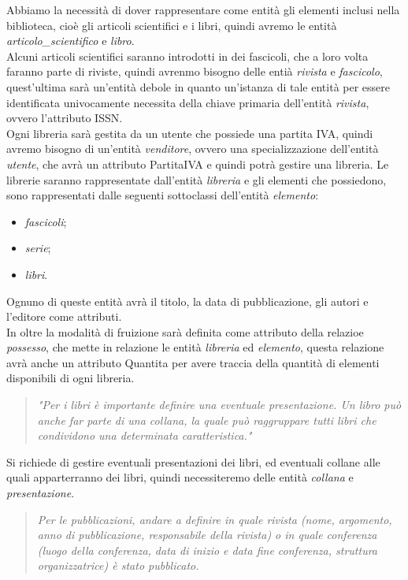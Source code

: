 \documentclass{article}
\begin{document}
Abbiamo la necessità di dover rappresentare come entità gli elementi inclusi nella biblioteca, cioè gli articoli scientifici e i libri, quindi avremo le entità \textit{articolo\_scientifico} e \textit{libro}.\\
Alcuni articoli scientifici saranno introdotti in dei fascicoli, che a loro volta faranno parte di riviste, quindi avrenmo bisogno delle entià \textit{rivista} e \textit{fascicolo}, quest'ultima sarà un'entità debole in quanto un'istanza di tale entità per essere identificata univocamente necessita della chiave primaria dell'entità \textit{rivista}, ovvero l'attributo ISSN.\\
Ogni libreria sarà gestita da un utente che possiede una partita IVA, quindi avremo bisogno di un'entità \textit{venditore}, ovvero una specializzazione dell'entità \textit{utente}, che avrà un attributo PartitaIVA e quindi potrà gestire una libreria. Le librerie saranno rappresentate dall'entità \textit{libreria} e gli elementi che possiedono, sono rappresentati dalle seguenti sottoclassi dell'entità \textit{elemento}: \begin{itemize} 
\item \textit{fascicoli}; 
\item \textit{serie};
\item \textit{libri}.
\end{itemize}
Ognuno di queste entità avrà il titolo, la data di pubblicazione, gli autori e l'editore come attributi.\\
In oltre la modalità di fruizione sarà definita come attributo della relazioe \textit{possesso}, che mette in relazione le entità \textit{libreria} ed \textit{elemento}, questa relazione avrà anche un attributo Quantita per avere traccia della quantità di elementi disponibili di ogni libreria.

\begin{quote}
\textit{"Per i libri è importante definire una eventuale presentazione. Un libro può anche far parte di una collana, la quale può raggruppare tutti libri che condividono una determinata caratteristica."}
\end{quote}

Si richiede di gestire eventuali presentazioni dei libri, ed eventuali collane alle quali apparterranno dei libri, quindi necessiteremo delle entità \textit{collana} e \textit{presentazione}.

\begin{quote}
\textit{Per le pubblicazioni, andare a definire in quale rivista (nome, argomento, anno di pubblicazione, responsabile della rivista) o in quale conferenza (luogo della conferenza, data di inizio e data fine conferenza, struttura organizzatrice) è stato pubblicato.}
\end{quote}
\end{document}
